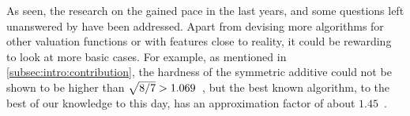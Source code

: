 \smallskip\noindent
As seen, the research on the \NSW{} gained pace in the last years, and some questions left unanswered by \citeauthor{APNSWuSVþUM} have been addressed.
Apart from devising more algorithms for other valuation functions or with features close to reality, it could be rewarding to look at more basic cases.
For example, as mentioned in \cref{subsec:intro:contribution}, the hardness of the symmetric additive \NSW{} could not be shown to be higher than \(\smash{\sqrt{8/7}} > 1.069\)~\cite{satiation_in_fisher_markets_and_approx_of_nsw}, but the best known algorithm, to the best of our knowledge to this day, has an approximation factor of about \(1.45\)~\cite{finding_fair_and_efficient_allocs}.





